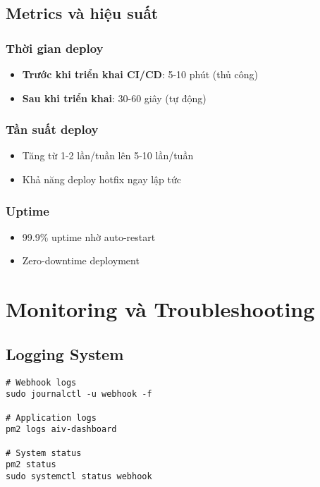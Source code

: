 \documentclass[12pt,a4paper]{article}
\begin{document}
\subsection{Metrics và hiệu suất}

\subsubsection{Thời gian deploy}
\begin{itemize}
    \item \textbf{Trước khi triển khai CI/CD}: 5-10 phút (thủ công)
    \item \textbf{Sau khi triển khai}: 30-60 giây (tự động)
\end{itemize}

\subsubsection{Tần suất deploy}
\begin{itemize}
    \item Tăng từ 1-2 lần/tuần lên 5-10 lần/tuần
    \item Khả năng deploy hotfix ngay lập tức
\end{itemize}

\subsubsection{Uptime}
\begin{itemize}
    \item 99.9\% uptime nhờ auto-restart
    \item Zero-downtime deployment
\end{itemize}

\section{Monitoring và Troubleshooting}

\subsection{Logging System}

\begin{lstlisting}[caption=Các lệnh monitoring]
# Webhook logs
sudo journalctl -u webhook -f

# Application logs
pm2 logs aiv-dashboard

# System status
pm2 status
sudo systemctl status webhook
\end{lstlisting}
\end{document}
